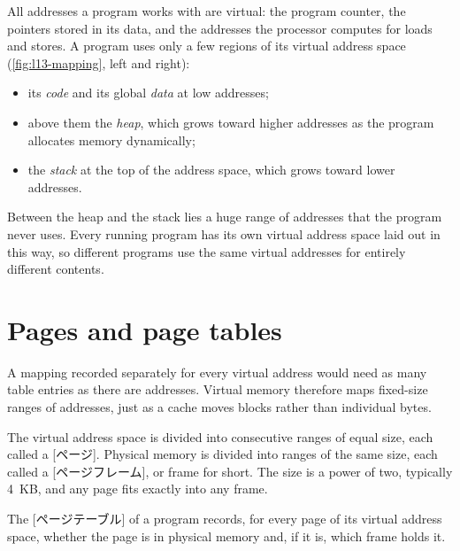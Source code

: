 \documentclass[../main.tex]{subfiles}
\begin{document}
All addresses a program works with are virtual: the program counter, the
pointers stored in its data, and the addresses the processor computes for
loads and stores.  A program uses only a few regions of its virtual address
space (\cref{fig:l13-mapping}, left and right):
\begin{itemize}
  \item its \emph{code} and its global \emph{data} at low addresses;
  \item above them the \emph{heap}, which grows toward higher addresses as the
    program allocates memory dynamically;
  \item the \emph{stack} at the top of the address space, which grows toward
    lower addresses.
\end{itemize}
Between the heap and the stack lies a huge range of addresses that the
program never uses.  Every running program has its own virtual address space
laid out in this way, so different programs use the same virtual addresses
for entirely different contents.

\section{Pages and page tables}
\label{sec:l13-pages}

A mapping recorded separately for every virtual address would need as many
table entries as there are addresses.  Virtual memory therefore maps fixed-size ranges of addresses, just as
a cache moves blocks rather than individual bytes.

\begin{definition}
  The virtual address space is divided into consecutive ranges of equal size,
  each called a [ページ].  Physical memory is divided into ranges of
  the same size, each called a [ページフレーム], or frame for
  short.  The size is a power of two, typically 4~KB, and any page fits
  exactly into any frame.
\end{definition}

\begin{definition}
  The [ページテーブル] of a program records, for every page
  of its virtual address space, whether the page is in physical memory and, if
  it is, which frame holds it.
\end{definition}
\end{document}

